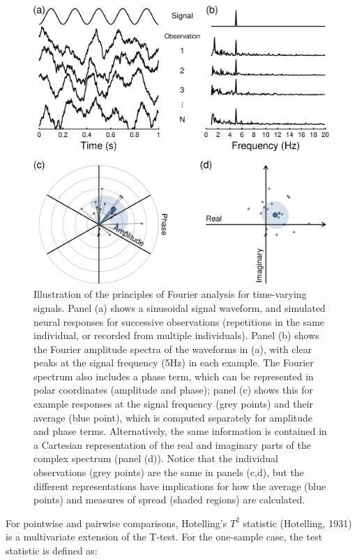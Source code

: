 \documentclass[]{article}
\begin{document}
\begin{figure}

{\centering \includegraphics{manuscript_files/figure-latex/fourierexplain-1} 

}

\caption{Illustration of the principles of Fourier analysis for time-varying signals. Panel (a) shows a sinusoidal signal waveform, and simulated neural responses for successive observations (repetitions in the same individual, or recorded from multiple individuals). Panel (b) shows the Fourier amplitude spectra of the waveforms in (a), with clear peaks at the signal frequency (5Hz) in each example. The Fourier spectrum also includes a phase term, which can be represented in polar coordinates (amplitude and phase); panel (c) shows this for example responses at the signal frequency (grey points) and their average (blue point), which is computed separately for amplitude and phase terms. Alternatively, the same information is contained in a Cartesian representation of the real and imaginary parts of the complex spectrum (panel (d)). Notice that the individual observations (grey points) are the same in panels (c,d), but the different representations have implications for how the average (blue points) and measures of spread (shaded regions) are calculated.}\label{fig:fourierexplain}
\end{figure}

For pointwise and pairwise comparisons, Hotelling's \(T^2\) statistic (Hotelling, 1931) is a multivariate extension of the T-test. For the one-sample case, the test statistic is defined as:
\end{document}
